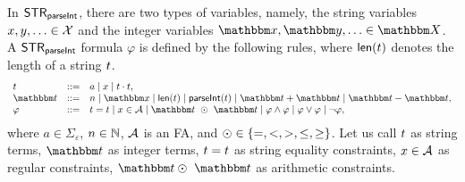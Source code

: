 In ${\sf STR}_{\textsf{parseInt}}$, there are two types of variables, namely, the string variables $x,y,\ldots \in \mathcal{X}$ and the integer variables $\ivarx,\ivary,\ldots \in \ivars$.
%
A ${\sf STR}_{\textsf{parseInt}}$ formula $\varphi$ is defined by the following rules, where $\textsf{len}(t)$ denotes the length of a string $t$.
\[
\begin{array}{l c l}
\sterm & ::= & a \mid \svarx \mid \sterm \concat \sterm, \\
\iterm & ::= & n \mid \ivarx \mid \len(\sterm) \mid \parseInt(\sterm) \mid \iterm + \iterm \mid \iterm - \iterm,\\
\varphi & ::= & \sterm = \sterm \mid x \in \Aut \mid \iterm\ \op\ \iterm \mid \varphi \wedge \varphi \mid \varphi \vee \varphi \mid \neg \varphi,
\end{array}
\]
where $a \in \Sigma_\varepsilon$, $n \in \mathbb{N}$, $\mathcal{A}$ is an FA, and $\odot \in \{=, < , >, \le, \ge\}$. Let us call $t$ as string terms, $\iterm$ as integer terms, $t = t$ as string equality constraints, $x \in \mathcal{A}$ as regular constraints, $\iterm \op\ \iterm$ as arithmetic constraints. 



